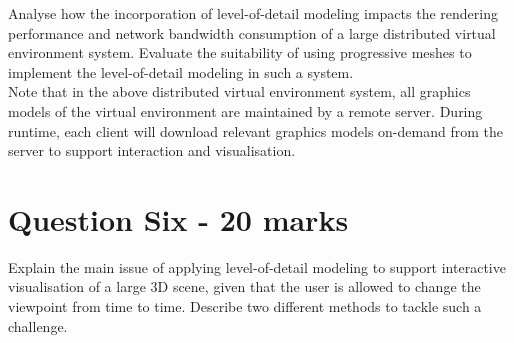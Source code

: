 \documentclass[paper=a4, fontsize=11pt]{scrartcl}
\numberwithin{equation}{section}		%
\numberwithin{figure}{section}			%
\numberwithin{table}{section}				%
\begin{document}
 Analyse how the incorporation of level-of-detail modeling impacts the rendering performance
and network bandwidth consumption of a large distributed virtual environment system.
Evaluate the suitability of using progressive meshes to implement the level-of-detail modeling
in such a system.\\
Note that in the above distributed virtual environment system, all graphics models of the virtual
environment are maintained by a remote server. During runtime, each client will download
relevant graphics models on-demand from the server to support interaction and visualisation.



\section*{Question Six - 20 marks}

Explain the main issue of applying level-of-detail modeling to support interactive visualisation
of a large 3D scene, given that the user is allowed to change the viewpoint from time to time.
Describe two different methods to tackle such a challenge. \\
\end{document}
